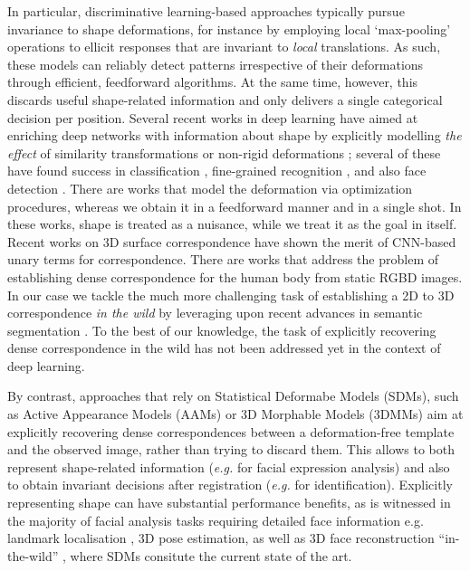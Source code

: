 \documentclass[10pt,twocolumn,letterpaper]{article}
\begin{document}
In particular, discriminative learning-based approaches typically pursue invariance to shape deformations, for instance by employing  local `max-pooling' operations to ellicit responses that are invariant to {\emph{local}} translations. As such, these models can reliably  detect patterns irrespective of their deformations through efficient, feedforward algorithms. At the same time, however, this discards useful shape-related information and only delivers a single categorical decision per position. Several recent works in deep learning have aimed at enriching deep networks with information about shape  by explicitly modelling {\em the effect} of  similarity transformations \cite{PapandreouKS15}
or non-rigid deformations \cite{JaderbergSZK15,HandaBPSMD16,ChenHW016}; several of these have found success in classification \cite{PapandreouKS15}, fine-grained recognition  \cite{JaderbergSZK15}, and also face detection \cite{ChenHW016}. There are works \cite{lades1993distortion,pedersoli2015elastic} that model the deformation via optimization procedures, whereas we obtain it in a feedforward manner and in a single shot. In these works, shape is treated as a nuisance, while we treat it as the goal in itself. Recent works on 3D surface correspondence \cite{ Br1,Br2} have shown the merit of CNN-based unary terms for correspondence. 
There are works that address the problem of  establishing dense correspondence for the human body from static RGBD images\cite{taylor2012vitruvian,pons2015metric,wei2016dense}.
In our case we tackle the much more challenging task of establishing a 2D to 3D correspondence {\emph{in the wild}} by leveraging upon recent advances in semantic segmentation \cite{CP2015Semantic}. To the best of our knowledge, the  task of explicitly recovering dense correspondence in the wild has not been addressed yet in the context of deep learning. 

By contrast, approaches that rely on  Statistical Deformabe Models (SDMs), such as Active Appearance Models (AAMs) or 3D Morphable Models (3DMMs) aim at explicitly recovering  dense correspondences between a deformation-free template and the observed image, rather than trying to discard them. This allows to both represent shape-related information (\textit{e.g.} for facial expression analysis) and also to obtain invariant decisions after registration (\textit{e.g.} for identification). Explicitly representing shape  can have substantial performance benefits, as is witnessed in the majority of facial analysis tasks requiring detailed face information e.g.  landmark localisation \cite{sagonas2016300}, 3D pose estimation, as well as 3D face reconstruction ``in-the-wild'' \cite{jourabloo2016large}, where SDMs consitute the current state of the art. 
\end{document}
